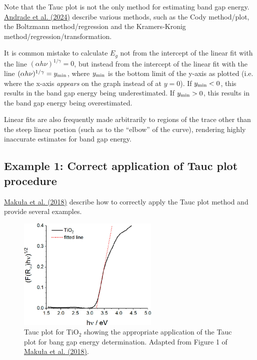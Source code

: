 \documentclass[letterpaper, 12pt]{article}
\begin{document}
Note that the Tauc plot is not the only method for estimating band gap energy. \href{https://doi.org/10.1016/j.apmt.2024.102094}{Andrade et al. (2024)} describe various methods, such as the Cody method/plot, the Boltzmann method/regression and the Kramers-Kronig method/regression/transformation.

It is common mistake to calculate $E_g$ not from the intercept of the linear fit with the line $(\alpha h \nu)^{1/\gamma} = 0$, but instead from the intercept of the linear fit with the line $(\alpha h \nu)^{1/\gamma} = y_{\rm min}$, where $y_{\rm min}$ is the bottom limit of the y-axis as plotted (i.e. where the x-axis \textit{appears} on the graph instead of at $y =0$). If $y_{\rm min} < 0$, this results in the band gap energy being underestimated. If $y_{\rm min} > 0$, this results in the band gap energy being overestimated.

Linear fits are also frequently made arbitrarily to regions of the trace other than the steep linear portion (such as to the ``elbow'' of the curve), rendering highly inaccurate estimates for band gap energy.

\subsection*{Example 1: Correct application of Tauc plot procedure}

\href{https://doi.org/10.1021/acs.jpclett.8b02892}{Maku\l{}a et al. (2018)} describe how to correctly apply the Tauc plot method and provide several examples.

\begin{figure}[h!tbp]
    \centering
    \includegraphics[width=0.6\textwidth]{img/tauc/images_large_jz-2018-02892b_0001.jpeg}
    \caption*{Tauc plot for TiO$_2$ showing the appropriate application of the Tauc plot for bang gap energy determination. Adapted from Figure 1 of \href{https://doi.org/10.1021/acs.jpclett.8b02892}{Maku\l{}a et al. (2018)}.}
\end{figure}
\end{document}
